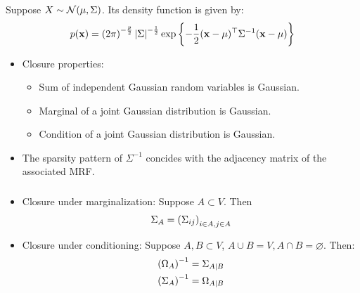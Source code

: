 \begin{frame}[fragile] \frametitle{}

    Suppose $X \sim \mathcal{N}(\mu, \Sigma)$. Its density function is given by:
	$$
    p(\mathbf{x}) = \left(2\pi\right)^{-\frac{p}{2}}\left|\Sigma\right|^{-\frac{1}{2}}
    \exp\left\{-\frac{1}{2}(\mathbf{x} - \mathbf{\mu})^\top \Sigma^{-1}
    (\mathbf{x} - \mathbf{\mu})\right\}
    $$
    \begin{itemize}
        \item Closure properties:
            \begin{itemize}
                \item Sum of independent Gaussian random variables is Gaussian.
                \item Marginal of a joint Gaussian distribution is Gaussian.
                \item Condition of a joint Gaussian distribution is Gaussian.
            \end{itemize}
        \item The sparsity pattern of $\Sigma^{-1}$ concides with the adjacency
            matrix of the associated MRF.
    \end{itemize}
\end{frame}
\begin{frame}[fragile] \frametitle{}

	\begin{itemize}
        \item Closure under marginalization:  Suppose $A \subset V$.  Then
            $$
            \Sigma_{A} = \left(\Sigma_{ij}\right)_{i\in A, j \in A}
            $$
        \item Closure under conditioning: Suppose  $A, B \subset V$, $A \cup B
            = V, A \cap B = \varnothing$.  Then:
            \begin{align*}
                \left( \Omega_A \right) ^{-1}  &= \Sigma_{A|B}   \\
                \left( \Sigma_A \right) ^{-1}  &= \Omega_{A|B}   \\
            \end{align*}
	\end{itemize}
\end{frame}
